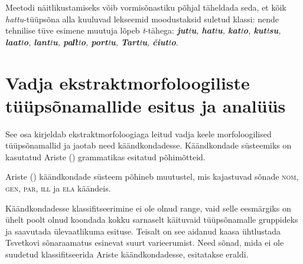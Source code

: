 \documentclass[12pt,a4paper]{article}
\newcommand{\vadja}[1]{\textit{#1}}
\newcommand{\msd}[1]{\textsc{#1}}
\begin{document}
Meetodi näitlikustamiseks võib vormisõnastiku põhjal täheldada seda, et kõik \textit{hattu}-tüüpsõna alla kuuluvad lekseemid moodustaksid suletud klassi: nende tehnilise tüve esimene muutuja lõpeb \textit{t}-tähega: \vadja{\textbf{jut}t\textbf{u}, \textbf{hat}t\textbf{u}, \textbf{kat}t\textbf{o}, \textbf{kut}t\textbf{su}, \textbf{laat}t\textbf{o}, \textbf{lant}t\textbf{u}, \textbf{pal̕t}t\textbf{o}, \textbf{port}t\textbf{u}, \textbf{Tart}t\textbf{u}, \textbf{čiut}t\textbf{o}}.






\newpage
\section{Vadja ekstraktmorfoloogiliste tüüpsõnamallide esitus ja analüüs}
\label{sec:analüüs}

See osa kirjeldab ekstraktmorfoloogiaga leitud vadja keele morfoloogilised tüüpsõna\-mallid ja jaotab need käänd\-kondadesse. Käändkondade süsteemiks on kasutatud Ariste (\citeyear{ariste_grammar_1968}) grammatikas esitatud põhimõtteid.

Ariste (\citeyear[42]{ariste_grammar_1968}) käändkondade süsteem põhineb muutustel, mis kajastuvad sõnade \msd{nom}, \msd{gen}, \msd{par}, \msd{ill} ja \msd{ela} käändeis. %

Käändkondadesse klassifitseerimine ei ole olnud range, vaid selle eesmärgiks on ühelt poolt olnud koondada kokku sarnaselt käituvaid tüüpsõna\-malle gruppideks ja saavutada üle\-vaatlikuma esituse. Teisalt on see aidanud kaasa ühtlustada Tsvetkovi sõna\-raamatus esinevat suurt varieerumist.  %
Need sõnad, mida ei ole suudetud klassifitseerida Ariste käändkondadesse, esitatakse eraldi.
\end{document}
